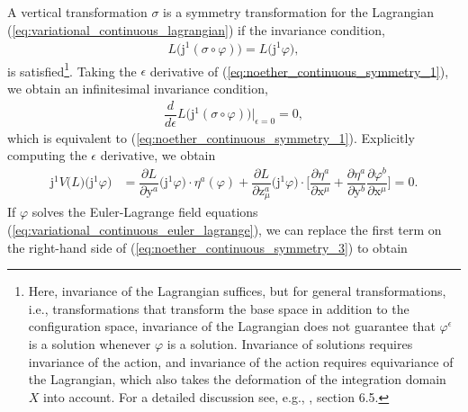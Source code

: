 \documentclass[12pt,a4paper,reqno]{article}
\begin{document}
A vertical transformation $\sigma$ is a symmetry transformation for the Lagrangian (\ref{eq:variational_continuous_lagrangian}) if the invariance condition,
\begin{align}\label{eq:noether_continuous_symmetry_1}
L \big( {\ensuremath{\mathrm{j}}}^{1} (\sigma \circ {\ensuremath{\varphi}}) \big) = L \big( {\ensuremath{\mathrm{j}}}^{1} {\ensuremath{\varphi}} \big) ,
\end{align}
is satisfied\footnote{
Here, invariance of the Lagrangian suffices, but for general transformations, i.e., transformations that transform the base space in addition to the configuration space, invariance of the Lagrangian does not guarantee that ${\ensuremath{\varphi}}^{\ensuremath{\epsilon}}$ is a solution whenever ${\ensuremath{\varphi}}$ is a solution.
Invariance of solutions requires invariance of the action, and invariance of the action requires equivariance of the Lagrangian, which also takes the deformation of the integration domain $X$ into account.
For a detailed discussion see, e.g., \citet{Lew:2003}, section 6.5.}.
Taking the ${\ensuremath{\epsilon}}$ derivative of (\ref{eq:noether_continuous_symmetry_1}), we obtain an infinitesimal invariance condition,
\begin{align}\label{eq:noether_continuous_symmetry_2}
\dfrac{d}{d{\ensuremath{\epsilon}}} L \big( {\ensuremath{\mathrm{j}}}^{1} (\sigma \circ {\ensuremath{\varphi}}) \big) \bigg\vert_{{\ensuremath{\epsilon}}=0}
= 0 ,
\end{align}
which is equivalent to (\ref{eq:noether_continuous_symmetry_1}).
Explicitly computing the ${\ensuremath{\epsilon}}$ derivative, we obtain
\begin{align}\label{eq:noether_continuous_symmetry_3}
{\ensuremath{\mathrm{j}}}^{1} V \big( L \big) \big( {\ensuremath{\mathrm{j}}}^{1} {\ensuremath{\varphi}} \big)
&= \dfrac{\partial L}{\partial {\ensuremath{{\ensuremath{\mathrm{{y}}}}}}^{a}} \big( {\ensuremath{\mathrm{j}}}^{1} {\ensuremath{\varphi}} \big) \cdot \eta^{a} ({\ensuremath{\varphi}}) + \dfrac{\partial L}{\partial {\ensuremath{{\ensuremath{\mathrm{{z}}}}}}^{a}_{\mu}} \big( {\ensuremath{\mathrm{j}}}^{1} {\ensuremath{\varphi}} \big) \cdot \bigg[ \dfrac{\partial \eta^{a}}{\partial {\ensuremath{{\ensuremath{\mathrm{{x}}}}}}^{\mu}} + \dfrac{\partial \eta^{a}}{\partial {\ensuremath{{\ensuremath{\mathrm{{y}}}}}}^{b}} \dfrac{\partial {\ensuremath{\varphi}}^{b}}{\partial {\ensuremath{{\ensuremath{\mathrm{{x}}}}}}^{\mu}} \bigg]
= 0 .
\end{align}
If ${\ensuremath{\varphi}}$ solves the Euler-Lagrange field equations (\ref{eq:variational_continuous_euler_lagrange}), we can replace the first term on the right-hand side of (\ref{eq:noether_continuous_symmetry_3}) to obtain
\end{document}
